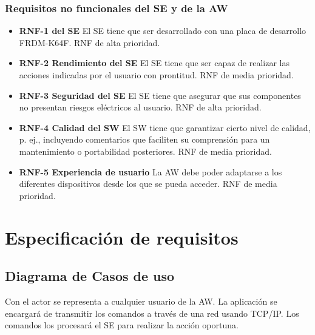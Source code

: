 \subsubsection{Requisitos no funcionales del SE y de la AW}
\label{sec:spec-nofuncionales}
\begin{itemize}
  \item \textbf{RNF-1   del SE} El SE tiene que ser
  desarrollado con una placa de desarrollo FRDM-K64F. RNF de alta prioridad.
  \item \textbf{RNF-2 Rendimiento del SE} El SE tiene que ser capaz de realizar
  las acciones indicadas por el usuario con prontitud. RNF de media prioridad.
  \item \textbf{RNF-3 Seguridad del SE} El SE tiene que asegurar que sus
  componentes no presentan riesgos eléctricos al usuario. RNF de alta prioridad.
  \item \textbf{RNF-4 Calidad del SW} El SW tiene que garantizar cierto nivel
  de calidad, p. ej., incluyendo comentarios que faciliten su comprensión para
  un mantenimiento o portabilidad posteriores. RNF de media prioridad.
  \item \textbf{RNF-5 Experiencia de usuario} La AW debe poder adaptarse a
  los diferentes dispositivos desde los que se pueda acceder. RNF de media
  prioridad.
\end{itemize}

\bigskip

\section{Especificación de requisitos} \label{sec:especificacion}
\subsection{Diagrama de Casos de uso} \label{sec:diag-casos-uso}
Con el actor se representa a cualquier usuario de la AW. La aplicación se
encargará de transmitir los comandos a través de una red usando TCP/IP.
Los comandos los procesará el SE para realizar la acción oportuna.

 
